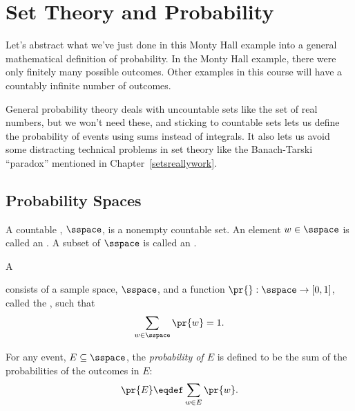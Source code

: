 
\begin{problems}
\classproblems
{}

\homeworkproblems
{}

\end{problems}

\section{Set Theory and Probability}

Let's abstract what we've just done in this Monty Hall example into a
general mathematical definition of probability.  In the Monty Hall
example, there were only finitely many possible outcomes.  Other examples
in this course will have a countably infinite number of outcomes.

General probability theory deals with uncountable sets like the set of
real numbers, but we won't need these, and sticking to countable sets lets
us define the probability of events using sums instead of integrals.  It
also lets us avoid some distracting technical problems in set theory like
the Banach-Tarski ``paradox'' mentioned in Chapter~\ref{setsreallywork}.

\subsection{Probability Spaces}

\begin{definition}\label{LN12:sampsp}
  A countable , $\sspace$, is a nonempty countable set.
  An element $w \in \sspace$ is called an .  A subset of
  $\sspace$ is called an .
\end{definition}

\begin{definition}\label{LN12:probsp}
  A  consists of a sample
  space, $\sspace$, and a function $\pr{}: \sspace\to [0,1]$, called
  the , such that
\[
\sum_{w \in \sspace} \pr{w} = 1.
\]

For any event, $E \subseteq \sspace$, the 
\emph{probability of $E$} is defined to be the sum of the probabilities of
the outcomes in $E$:
\[
\pr{E} \eqdef \sum_{w \in E} \pr{w}.
\]
\end{definition}

